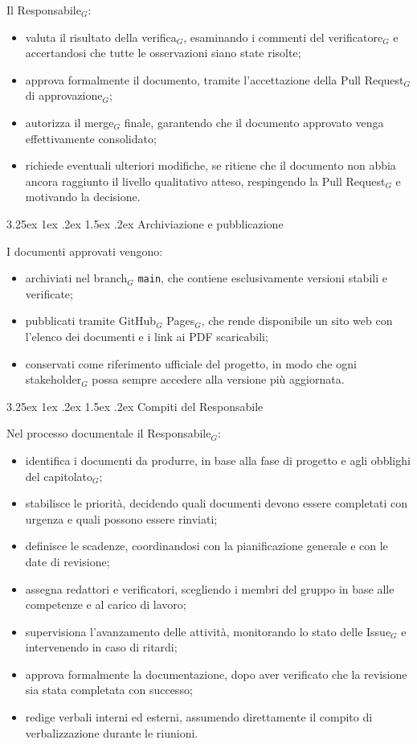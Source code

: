\documentclass[a4paper, 10pt]{article}
\makeatletter
\renewcommand\paragraph{\@startsection{paragraph}{4}{\z@}%
  {3.25ex \@plus1ex \@minus .2ex}%
  {1.5ex \@plus .2ex}%
  {\normalfont\normalsize\bfseries}}
\makeatother
\begin{document}
Il Responsabile$_G$:
\begin{itemize}
    \item valuta il risultato della verifica$_G$, esaminando i commenti del verificatore$_G$ e accertandosi che tutte le osservazioni siano state risolte;
    \item approva formalmente il documento, tramite l'accettazione della Pull Request$_G$ di approvazione$_G$;
    \item autorizza il merge$_G$ finale, garantendo che il documento approvato venga effettivamente consolidato;
    \item richiede eventuali ulteriori modifiche, se ritiene che il documento non abbia ancora raggiunto il livello qualitativo atteso, respingendo la Pull Request$_G$ e motivando la decisione.
\end{itemize}

\paragraph{Archiviazione e pubblicazione}

I documenti approvati vengono:
\begin{itemize}
    \item archiviati nel branch$_G$ \texttt{main}, che contiene esclusivamente versioni stabili e verificate;
    \item pubblicati tramite GitHub$_G$ Pages$_G$, che rende disponibile un sito web con l'elenco dei documenti e i link ai PDF scaricabili;
    \item conservati come riferimento ufficiale del progetto, in modo che ogni stakeholder$_G$ possa sempre accedere alla versione più aggiornata.
\end{itemize}

\paragraph{Compiti del Responsabile}

Nel processo documentale il Responsabile$_G$:
\begin{itemize}
    \item identifica i documenti da produrre, in base alla fase di progetto e agli obblighi del capitolato$_G$;
    \item stabilisce le priorità, decidendo quali documenti devono essere completati con urgenza e quali possono essere rinviati;
    \item definisce le scadenze, coordinandosi con la pianificazione generale e con le date di revisione;
    \item assegna redattori e verificatori, scegliendo i membri del gruppo in base alle competenze e al carico di lavoro;
    \item supervisiona l'avanzamento delle attività, monitorando lo stato delle Issue$_G$ e intervenendo in caso di ritardi;
    \item approva formalmente la documentazione, dopo aver verificato che la revisione sia stata completata con successo;
    \item redige verbali interni ed esterni, assumendo direttamente il compito di verbalizzazione durante le riunioni.
\end{itemize}
\end{document}
